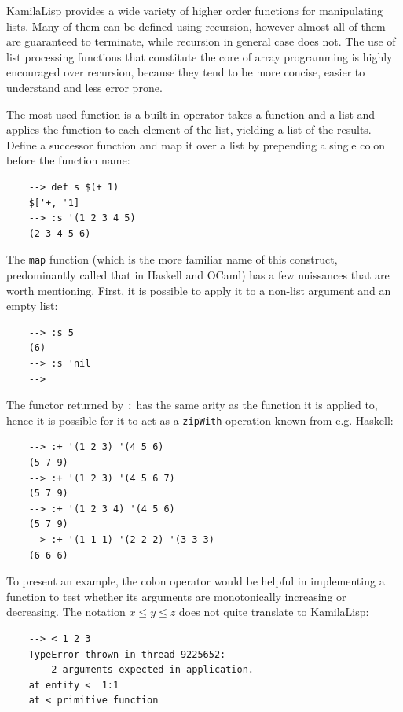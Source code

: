 KamilaLisp provides a wide variety of higher order functions for manipulating lists. Many of them can be defined using recursion, however almost all of them are guaranteed to terminate, while recursion in general case does not. The use of list processing functions that constitute the core of array programming is highly encouraged over recursion, because they tend to be more concise, easier to understand and less error prone.

The most used function is a built-in operator takes a function and a list and applies the function to each element of the list, yielding a list of the results. Define a successor function and map it over a list by prepending a single colon before the function name:

\begin{Verbatim}
    --> def s $(+ 1)
    $['+, '1]
    --> :s '(1 2 3 4 5)
    (2 3 4 5 6)
\end{Verbatim}

The \verb|map| function (which is the more familiar name of this construct, predominantly called that in Haskell and OCaml) has a few nuissances that are worth mentioning. First, it is possible to apply it to a non-list argument and an empty list:

\begin{Verbatim}
    --> :s 5
    (6)
    --> :s 'nil
    -->
\end{Verbatim}

The functor returned by \verb|:| has the same arity as the function it is applied to, hence it is possible for it to act as a \verb|zipWith| operation known from e.g. Haskell:

\begin{Verbatim}
    --> :+ '(1 2 3) '(4 5 6)
    (5 7 9)
    --> :+ '(1 2 3) '(4 5 6 7)
    (5 7 9)
    --> :+ '(1 2 3 4) '(4 5 6)
    (5 7 9)
    --> :+ '(1 1 1) '(2 2 2) '(3 3 3)
    (6 6 6)
\end{Verbatim}

To present an example, the colon operator would be helpful in implementing a function to test whether its arguments are monotonically increasing or decreasing. The notation $x \le y \le z$ does not quite translate to KamilaLisp:

\begin{Verbatim}
    --> < 1 2 3
    TypeError thrown in thread 9225652:
        2 arguments expected in application.
    at entity <  1:1
    at < primitive function
\end{Verbatim}

